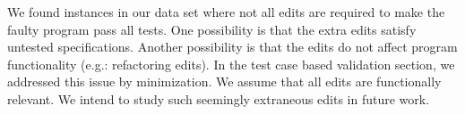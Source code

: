 \documentclass[sigconf, timestamp-false, anonymous=true]{acmart}
\begin{document}
We found instances in our data set where not all edits are required to 
make the faulty program pass all tests. One possibility is that the extra 
edits satisfy untested specifications. Another possibility is that the edits 
do not affect program functionality (e.g.: refactoring edits). In the test case based
validation section, we addressed this issue by minimization. We assume 
that all edits are functionally relevant. We intend to study such seemingly
extraneous edits in future work.



\end{document}
